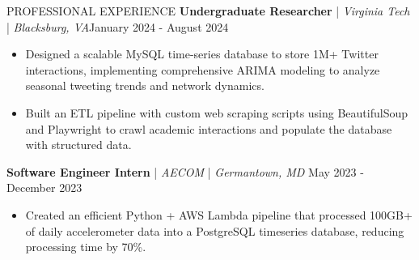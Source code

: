 \begin{rSection}{PROFESSIONAL EXPERIENCE}
    \textbf{Undergraduate Researcher} | \textit{Virginia Tech} | \textit{Blacksburg, VA}\hfill January 2024 - August 2024\\
    \begin{itemize}[leftmargin=12pt]
        \itemsep -4pt {} \vspace{-1.4em}
        \item Designed a scalable MySQL time-series database to store 1M+ Twitter interactions, implementing comprehensive ARIMA modeling to analyze seasonal tweeting trends and network dynamics.
        \item Built an ETL pipeline with custom web scraping scripts using BeautifulSoup and Playwright to crawl academic interactions and populate the database with structured data.
    \end{itemize}
    
    \textbf{Software Engineer Intern} | \textit{AECOM} | \textit{Germantown, MD} \hfill May 2023 - December 2023\\
    \begin{itemize}[leftmargin=12pt]
        \itemsep -4pt {} \vspace{-1.4em}
        \item Created an efficient Python + AWS Lambda pipeline that processed 100GB+ of daily accelerometer data into a PostgreSQL timeseries database, reducing processing time by 70\%.
    \end{itemize}

\end{rSection}
